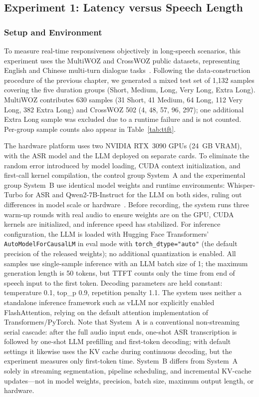 \documentclass[a4paper,11pt]{article}
\begin{document}
\subsection{Experiment 1: Latency versus Speech Length}

\subsubsection{Setup and Environment}

To measure real-time responsiveness objectively in long-speech scenarios, this experiment uses the MultiWOZ and CrossWOZ public datasets, representing English and Chinese multi-turn dialogue tasks~\cite{ref18,ref19}. Following the data-construction procedure of the previous chapter, we generated a mixed test set of 1,132 samples covering the five duration groups (Short, Medium, Long, Very Long, Extra Long). MultiWOZ contributes 630 samples (31 Short, 41 Medium, 64 Long, 112 Very Long, 382 Extra Long) and CrossWOZ 502 (4, 48, 57, 96, 297); one additional Extra Long sample was excluded due to a runtime failure and is not counted. Per-group sample counts also appear in Table~\ref{tab:ttft}.

The hardware platform uses two NVIDIA RTX~3090 GPUs (24~GB VRAM), with the ASR model and the LLM deployed on separate cards. To eliminate the random error introduced by model loading, CUDA context initialization, and first-call kernel compilation, the control group System~A and the experimental group System~B use identical model weights and runtime environments: Whisper-Turbo for ASR and Qwen2-7B-Instruct for the LLM on both sides, ruling out differences in model scale or hardware~\cite{ref20}. Before recording, the system runs three warm-up rounds with real audio to ensure weights are on the GPU, CUDA kernels are initialized, and inference speed has stabilized. For inference configuration, the LLM is loaded with Hugging Face Transformers' \texttt{AutoModelForCausalLM} in eval mode with \texttt{torch\_dtype="auto"} (the default precision of the released weights); no additional quantization is enabled. All samples use single-sample inference with an LLM batch size of 1; the maximum generation length is 50 tokens, but TTFT counts only the time from end of speech input to the first token. Decoding parameters are held constant: temperature 0.1, top\_p 0.9, repetition penalty 1.1. The system uses neither a standalone inference framework such as vLLM nor explicitly enabled FlashAttention, relying on the default attention implementation of Transformers/PyTorch. Note that System~A is a conventional non-streaming serial cascade: after the full audio input ends, one-shot ASR transcription is followed by one-shot LLM prefilling and first-token decoding; with default settings it likewise uses the KV cache during continuous decoding, but the experiment measures only first-token time. System~B differs from System~A solely in streaming segmentation, pipeline scheduling, and incremental KV-cache updates---not in model weights, precision, batch size, maximum output length, or hardware.
\end{document}
